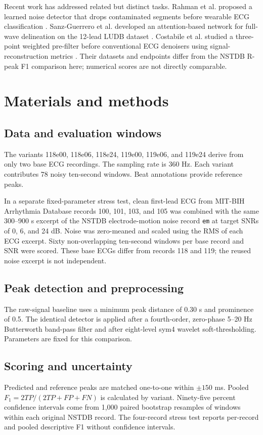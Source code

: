 \documentclass[preprint,12pt]{elsarticle}
\begin{document}
Recent work has addressed related but distinct tasks. Rahman et al. proposed a learned noise detector that drops contaminated segments before wearable ECG classification \cite{rahman2025}. Sanz-Guerrero et al. developed an attention-based network for full-wave delineation on the 12-lead LUDB dataset \cite{sanz2026}. Costabile et al. studied a three-point weighted pre-filter before conventional ECG denoisers using signal-reconstruction metrics \cite{costabile2026}. Their datasets and endpoints differ from the NSTDB R-peak F1 comparison here; numerical scores are not directly comparable.

\section{Materials and methods}
\subsection{Data and evaluation windows}
The variants 118e00, 118e06, 118e24, 119e00, 119e06, and 119e24 derive from only two base ECG recordings. The sampling rate is 360 Hz. Each variant contributes 78 noisy ten-second windows. Beat annotations provide reference peaks.

In a separate fixed-parameter stress test, clean first-lead ECG from MIT-BIH Arrhythmia Database records 100, 101, 103, and 105 \cite{mitdb} was combined with the same 300--900 s excerpt of the NSTDB electrode-motion noise record \texttt{em} at target SNRs of 0, 6, and 24 dB. Noise was zero-meaned and scaled using the RMS of each ECG excerpt. Sixty non-overlapping ten-second windows per base record and SNR were scored. These base ECGs differ from records 118 and 119; the reused noise excerpt is not independent.

\subsection{Peak detection and preprocessing}
The raw-signal baseline uses a minimum peak distance of 0.30 s and prominence of 0.5. The identical detector is applied after a fourth-order, zero-phase 5--20 Hz Butterworth band-pass filter and after eight-level sym4 wavelet soft-thresholding. Parameters are fixed for this comparison.

\subsection{Scoring and uncertainty}
Predicted and reference peaks are matched one-to-one within $\pm150$ ms. Pooled $F_1=2TP/(2TP+FP+FN)$ is calculated by variant. Ninety-five percent confidence intervals come from 1,000 paired bootstrap resamples of windows within each original NSTDB record. The four-record stress test reports per-record and pooled descriptive F1 without confidence intervals.
\end{document}
